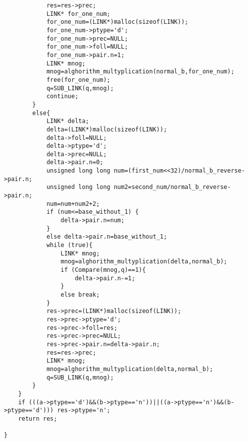\documentclass[14pt, russian]{scrartcl}
\begin{document}
\begin{code}
\begin{verbatim}
            res=res->prec;
            LINK* for_one_num;
            for_one_num=(LINK*)malloc(sizeof(LINK));
            for_one_num->ptype='d';
            for_one_num->prec=NULL;
            for_one_num->foll=NULL;
            for_one_num->pair.n=1;
            LINK* mnog;
            mnog=alghorithm_multyplication(normal_b,for_one_num);
            free(for_one_num);
            q=SUB_LINK(q,mnog);
            continue;
        }
        else{
            LINK* delta;
            delta=(LINK*)malloc(sizeof(LINK));
            delta->foll=NULL;
            delta->ptype='d';
            delta->prec=NULL;
            delta->pair.n=0;
            unsigned long long num=(first_num<<32)/normal_b_reverse->pair.n;
            unsigned long long num2=second_num/normal_b_reverse->pair.n;
            num=num+num2+2;
            if (num<=base_without_1) {
                delta->pair.n=num;
            }
            else delta->pair.n=base_without_1;
            while (true){
                LINK* mnog;
                mnog=alghorithm_multyplication(delta,normal_b);
                if (Compare(mnog,q)==1){
                    delta->pair.n-=1;
                } 
                else break;
            }
            res->prec=(LINK*)malloc(sizeof(LINK));
            res->prec->ptype='d';
            res->prec->foll=res;
            res->prec->prec=NULL;
            res->prec->pair.n=delta->pair.n;
            res=res->prec;
            LINK* mnog;
            mnog=alghorithm_multyplication(delta,normal_b);
            q=SUB_LINK(q,mnog);
        }
    }
    if (((a->ptype=='d')&&(b->ptype=='n'))||((a->ptype=='n')&&(b->ptype=='d'))) res->ptype='n';
    return res;
    
}

\end{verbatim}
\end{code}
\end{document}
